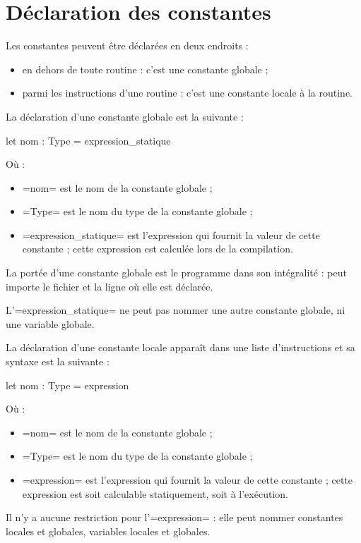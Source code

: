 




\chapter{Déclaration des constantes}

Les constantes peuvent être déclarées en deux endroits :
\begin{itemize}
  \item en dehors de toute routine : c'est une constante globale ;
  \item parmi les instructions d'une routine : c'est une constante locale à la routine.
\end{itemize}





La déclaration d'une constante globale est la suivante :

\begin{PLM}
let nom : Type = expression_statique
\end{PLM}

Où :
\begin{itemize}
  \item \plm=nom= est le nom de la constante globale ;
  \item \plm=Type= est le nom du type de la constante globale ;
  \item \plm=expression_statique= est l'expression qui fournit la valeur de cette constante ; cette expression est calculée lors de la compilation.
\end{itemize}

La portée d'une constante globale est le programme dans son intégralité : peut importe le fichier et la ligne où elle est déclarée.

L'\plm=expression_statique= ne peut pas nommer une autre constante globale, ni une variable globale. 




La déclaration d'une constante locale apparaît dans une liste d'instructions et sa syntaxe est la suivante :

\begin{PLM}
let nom : Type = expression
\end{PLM}

Où :
\begin{itemize}
  \item \plm=nom= est le nom de la constante globale ;
  \item \plm=Type= est le nom du type de la constante globale ;
  \item \plm=expression= est l'expression qui fournit la valeur de cette constante ; cette expression est soit calculable statiquement, soit à l'exécution.
\end{itemize}

Il n'y a aucune restriction pour l'\plm=expression= : elle peut nommer constantes locales et globales, variables locales et globales.
